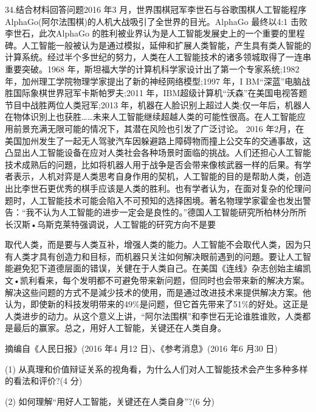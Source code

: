\documentclass[UTF8,11pt]{ctexart}
\begin{document}
34.结合材料回答问题2016 年3 月，世界围棋冠军李世石与谷歌围棋人工智能程序AlphaGo(阿尔法围棋)的人机大战吸引了全世界的目光。AlphaGo 最终以4:1 击败李世石，此次AlphaGo 的胜利被业界认为是人工智能发展史上的一个重要的里程碑。人工智能一般被认为是通过模拟，延伸和扩展人类智能，产生具有类人智能的计算系统。经过半个多世纪的努力，人类在人工智能技术的诸多领城取得了一连串重要突破。1968 年，斯坦福大学的计算机科学家设计出了第一个专家系统;1982 年，加州理工学院物理学家提出了新的神经网络模型;1997 年，I BM“深蓝”电脑战胜国际象棋世界冠军卡斯帕罗夫;2011 年，IBM超级计算机“沃森”在美国电视答题节目中战胜两位人类冠军;2013 年，机器在人脸识别上超过人类;仅一年后，机器人在物体识別上也获胜……未来人工智能继续超越人类的可能性很高。在人工智能应用前景充满无限可能的情况下，其潜在风险也引发了广泛讨论。 2016 年2月，在美国加州发生了一起无人驾驶汽车因躲避路上障碍物而撞上公交车的交通事故，这凸显出人工智能设备在应对人类社会各种场景时面临的挑战。人们还担心人工智能技术成熟后的问題，比如将机器人用于战争是否会带来像核武器一样的后果。有学者表示，人机对弈是人类思考自身作用的契机，人工智能的目的是帮助人类，创造出比李世石更优秀的棋手应该是人类的胜利。也有学者认为，在面对复杂的伦理问题时，人工智能技术可能会陷入不可预知的选择困境。著名物理学家霍金也发出警告：“我不认为人工智能的进步一定会是良性的。”德国人工智能研究所柏林分所所长汉斯•乌斯克莱特强调说，人工智能的矸究方向不是要


取代人类，而是要与人类互补，增强人类的能力。人工智能不会取代人类，因为只有人类才具有创造力和目标，而机器只关注如何解决眼前遇到的问題。要让人工智能避免犯下道德层面的错误，关健在于人类自己。在美国《连线》杂志创始主编凯文•凯利看来，每个发明都不可避免带来新问题，但同时也会带来新的解决方案。解决这些问题的方式不是減少技术的使用，而是通过改进技术来提供解决方案。他认为，即使新的科技发明带来的49\%是问题，但它首先带来了51\%的好处。这正是人类进步的动力。从这个意义上讲，“阿尔法围棋”和李世石无论谁胜谁败，人类都是最后的赢家。总之，用好人工智能，关键还在人类自身。

摘编自《人民日报》(2016 年4 月12 日)、《参考消息》(2016 年6 月30 日)

(1) 从真理和价值辩证关系的视角看，为什么人们对人工智能技术会产生多种多样的看法和评价?(4 分)


(2) 如何理解“用好人工智能，关键还在人类自身”?(6 分)
\end{document}
